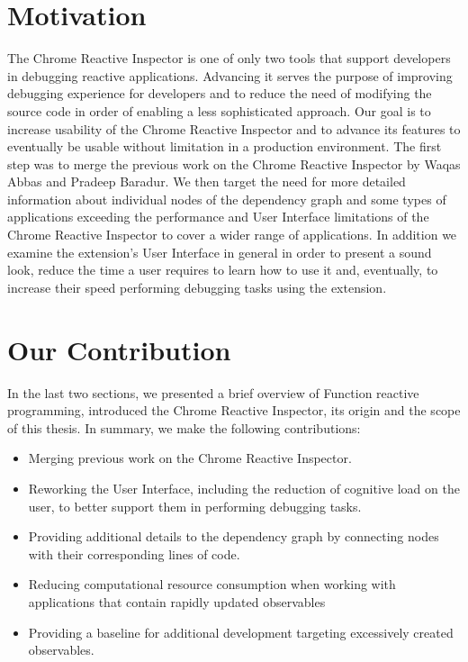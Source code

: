 \section{Motivation}
The Chrome Reactive Inspector is one of only two tools that support developers in debugging reactive applications. Advancing it serves the purpose of improving debugging experience for developers and to reduce the need of modifying the source code in order of enabling a less sophisticated approach. Our goal is to increase usability of the Chrome Reactive Inspector and to advance its features to eventually be usable without limitation in a production environment. The first step was to merge the previous work on the Chrome Reactive Inspector by Waqas Abbas and Pradeep Baradur. We then target the need for more detailed information about individual nodes of the dependency graph and some types of applications exceeding the performance and User Interface limitations of the Chrome Reactive Inspector to cover a wider range of applications. In addition we examine the extension's User Interface in general in order to present a sound look, reduce the time a user requires to learn how to use it and, eventually, to increase their speed performing debugging tasks using the extension.


\section{Our Contribution}

In the last two sections, we presented a brief overview of Function reactive programming, introduced the Chrome Reactive Inspector, its origin and the scope of this thesis.
In summary, we make the following contributions:

\begin{itemize}
	\item Merging previous work on the Chrome Reactive Inspector.
	\item Reworking the User Interface, including the reduction of cognitive load on the user, to better support them in performing debugging tasks.
	\item Providing additional details to the dependency graph by connecting nodes with their corresponding lines of code.
	\item Reducing computational resource consumption when working with applications that contain rapidly updated observables
	\item Providing a baseline for additional development targeting excessively created observables.
\end{itemize}

